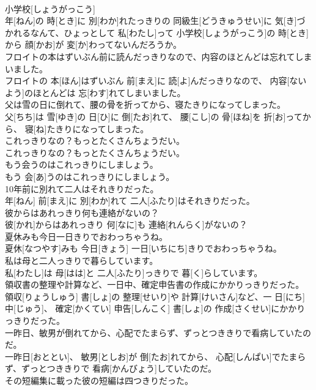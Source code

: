 \documentclass[8pt]{extreport}
\begin{document}
\begin{CJK}{UTF8}{min}
\\	小学校[しょうがっこう] 
\\	年[ねん]の 時[とき]に 別[わか]れたっきりの 同級生[どうきゅうせい]に 気[き]づかれるなんて、ひょっとして 私[わたし]って 小学校[しょうがっこう]の 時[とき]から 顔[かお]が 変[か]わってないんだろうか。
\\	フロイトの本はずいぶん前に読んだっきりなので、内容のほとんどは忘れてしまいました。	
\\	フロイトの 本[ほん]はずいぶん 前[まえ]に 読[よ]んだっきりなので、 内容[ないよう]のほとんどは 忘[わす]れてしまいました。
\\	父は雪の日に倒れて、腰の骨を折ってから、寝たきりになってしまった。	
\\	父[ちち]は 雪[ゆき]の 日[ひ]に 倒[たお]れて、 腰[こし]の 骨[ほね]を 折[お]ってから、 寝[ね]たきりになってしまった。
\\	これっきりなの？もっとたくさんちょうだい。	
\\	これっきりなの？もっとたくさんちょうだい。
\\	もう会うのはこれっきりにしましょう。	
\\	もう 会[あ]うのはこれっきりにしましょう。
\\	10年前に別れて二人はそれきりだった。	
\\	年[ねん] 前[まえ]に 別[わか]れて 二人[ふたり]はそれきりだった。
\\	彼からはあれっきり何も連絡がないの？	
\\	彼[かれ]からはあれっきり 何[なに]も 連絡[れんらく]がないの？
\\	夏休みも今日一日きりでおわっちゃうね。	
\\	夏休[なつやす]みも 今日[きょう] 一日[いちにち]きりでおわっちゃうね。
\\	私は母と二人っきりで暮らしています。	
\\	私[わたし]は 母[はは]と 二人[ふたり]っきりで 暮[く]らしています。
\\	領収書の整理や計算など、一日中、確定申告書の作成にかかりっきりだった。	
\\	領収[りょうしゅう] 書[しょ]の 整理[せいり]や 計算[けいさん]など、一 日[にち] 中[じゅう]、 確定[かくてい] 申告[しんこく] 書[しょ]の 作成[さくせい]にかかりっきりだった。
\\	一昨日、敏男が倒れてから、心配でたまらず、ずっとつききりで看病していたのだ。	
\\	一昨日[おととい]、 敏男[としお]が 倒[たお]れてから、 心配[しんぱい]でたまらず、ずっとつききりで 看病[かんびょう]していたのだ。
\\	その短編集に載った彼の短編は四つきりだった。	

\end{CJK}
\end{document}
